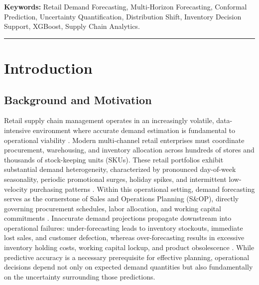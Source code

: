 \documentclass[11pt,a4paper]{article}
\begin{document}
\textbf{Keywords:} Retail Demand Forecasting, Multi-Horizon Forecasting, Conformal Prediction, Uncertainty Quantification, Distribution Shift, Inventory Decision Support, XGBoost, Supply Chain Analytics.

\vspace{0.5cm}
\hrule
\vspace{0.5cm}

\section{Introduction}
\label{sec:introduction}

\subsection{Background and Motivation}
\label{sec:intro_bg}
Retail supply chain management operates in an increasingly volatile, data-intensive environment where accurate demand estimation is fundamental to operational viability \cite{tiwari2025agentic}. Modern multi-channel retail enterprises must coordinate procurement, warehousing, and inventory allocation across hundreds of stores and thousands of stock-keeping units (SKUs). These retail portfolios exhibit substantial demand heterogeneity, characterized by pronounced day-of-week seasonality, periodic promotional surges, holiday spikes, and intermittent low-velocity purchasing patterns \cite{mitra2022comparative, venkiteela2025machine}. Within this operational setting, demand forecasting serves as the cornerstone of Sales and Operations Planning (S\&OP), directly governing procurement schedules, labor allocation, and working capital commitments \cite{mustapha2025forecasting}. Inaccurate demand projections propagate downstream into operational failures: under-forecasting leads to inventory stockouts, immediate lost sales, and customer defection, whereas over-forecasting results in excessive inventory holding costs, working capital lockup, and product obsolescence \cite{spanos2022application, malik2024sales}. While predictive accuracy is a necessary prerequisite for effective planning, operational decisions depend not only on expected demand quantities but also fundamentally on the uncertainty surrounding those predictions.
\end{document}
